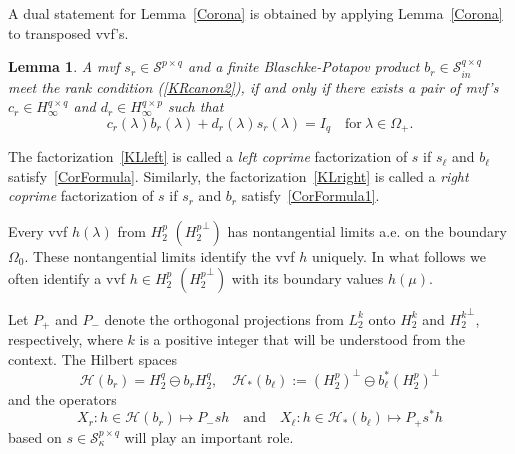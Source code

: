 \documentclass[12pt,twoside,a4paper]{amsart}
\newtheorem{lem}[thm]{Lemma}
\theoremstyle{definition}
\numberwithin{equation}{section}
\begin{document}
A dual statement for Lemma~\ref{Corona} is obtained by applying
Lemma~\ref{Corona} to transposed vvf's.
\begin{lem}\label{Corona1}
A mvf $s_r\in{{\mathcal S}}^{p\times q}$ and a finite Blaschke-Potapov
product $b_r\in {\mathcal S}_{in}^{q\times q}$ meet the rank condition (\ref{KRcanon2}),
if and only if there exists a pair of mvf's $c_r\in
H^{q\times q}_\infty$ and $d_r\in H^{q\times p}_\infty$ such that
\begin{equation}\label{CorFormula1}
c_r({\lambda})b_r({\lambda})+d_r({\lambda})s_r({\lambda})=I_q\quad \text{for}\ {\lambda}\in
\Omega_+.
\end{equation}
\end{lem}
The factorization~\eqref{KLleft} is called a {\it left coprime} factorization of $s$ if $s_\ell$ and
$b_\ell$ satisfy~\eqref{CorFormula}.
Similarly,  the factorization~\eqref{KLright} is called a {\it right coprime} factorization of $s$
if $s_r$ and $b_r$ satisfy~\eqref{CorFormula1}.

Every vvf $h(\lambda)$ from $H_2^p$ $({H_2^p}^\perp)$  has
nontangential limits a.e. on the boundary $\Omega_0$.  These nontangential
limits identify the vvf $h$
uniquely. In what follows we often identify a vvf $h\in H_2^p$
$({H_2^p}^\perp)$ with its boundary values $h(\mu)$.

Let
$P_+$ and $P_-$ denote the orthogonal projections from $L_2^k$ onto $H_2^k$
and ${H_2^k}^\perp$, respectively, where $k$ is a positive integer that will
be understood from the context. The Hilbert spaces
\begin{equation}
\label{eq:feb10a8}
{{\mathcal H}}(b_r)=H_2^q\ominus b_rH_2^q, \quad {{\mathcal H}}_*(b_\ell):=(H_2^p)^\perp\ominus
b_\ell^*(H_2^p)^\perp
\end{equation}
and the operators
\begin{equation}
\label{eq:feb10b8}
X_r: h\in{{\mathcal H}}(b_r)\mapsto P_-sh\quad\text{and}\quad
X_\ell: h\in{{\mathcal H}}_*(b_\ell)
\mapsto P_+s^*h
\end{equation}
based on $s\in {\mathcal S}_{\kappa}^{p\times q}$ will play an important role.
\end{document}

